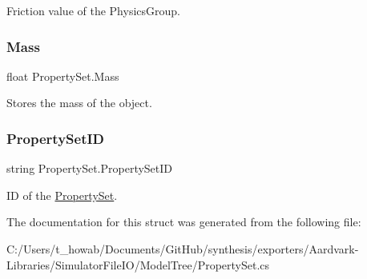 Friction value of the Physics\+Group. 

\mbox{\label{struct_property_set_a39e7117921eaa970b4d6e4aeb19fd653}} 
\subsubsection{\texorpdfstring{Mass}{Mass}}
{\footnotesize\ttfamily float Property\+Set.\+Mass}



Stores the mass of the object. 

\mbox{\label{struct_property_set_a8366cd9dd1ed6a6fccb6746f9e69e885}} 
\subsubsection{\texorpdfstring{Property\+Set\+ID}{PropertySetID}}
{\footnotesize\ttfamily string Property\+Set.\+Property\+Set\+ID}



ID of the \hyperlink{struct_property_set}{Property\+Set}. 



The documentation for this struct was generated from the following file\+:\begin{DoxyCompactItemize}
\item 
C\+:/\+Users/t\+\_\+howab/\+Documents/\+Git\+Hub/synthesis/exporters/\+Aardvark-\/\+Libraries/\+Simulator\+File\+I\+O/\+Model\+Tree/Property\+Set.\+cs\end{DoxyCompactItemize}
